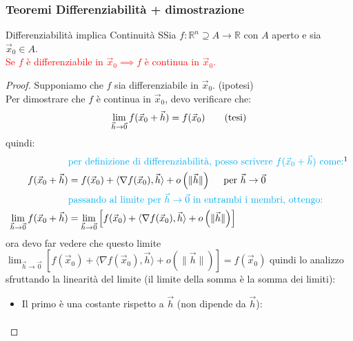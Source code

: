 \documentclass{article}  %
\begin{document}
\subsubsection{Teoremi Differenziabilità + dimostrazione}
\begin{theorem}{Differenziabilità implica Continuità}
	SSia $f: \mathbb{R}^n \supseteq A \to \mathbb{R}$ con $A$ aperto e sia $\vec{x}_0 \in A$. \\
	\textcolor{red}{Se $f$ è differenziabile in $\vec{x}_0 \implies f$ è continua in $\vec{x}_0$.}
	\begin{proof}
		Supponiamo che $f$ sia differenziabile in $\vec{x}_0$. \hfill(ipotesi) \\
		Per dimostrare che $f$ è continua in $\vec{x}_0$, devo verificare che:
		\begin{align*}
			\lim_{\vec{h} \to \vec{0}} f(\vec{x}_0 + \vec{h}) = f(\vec{x}_0) \tag*{(\text{tesi})}
		\end{align*}
		quindi:
		\begin{align*}
			                                                  & \textcolor{cyan}{\text{per definizione di differenziabilità, posso scrivere } f(\vec{x}_0 + \vec{h}) \text{ come:}} \footnotemark     \\
			f(\vec{x}_0 + \vec{h})                            & = f(\vec{x}_0)+ \langle \nabla f(\vec{x}_0), \vec{h} \rangle + o \left( \| \vec{h} \|\right) \quad \text{ per } \vec{h} \to \vec{0}   \\
			                                                  & \textcolor{cyan}{\text{passando al limite per } \vec{h} \to \vec{0} \text{ in entrambi i membri, ottengo:}}                           \\
			\lim_{\vec{h} \to \vec{0}} f(\vec{x}_0 + \vec{h}) & = \lim_{\vec{h} \to \vec{0}} \left[f(\vec{x}_0)+ \langle \nabla f(\vec{x}_0), \vec{h} \rangle + o \left( \| \vec{h} \|\right) \right]
		\end{align*}
		ora devo far vedere che questo limite $\lim_{\vec{h} \to \vec{0}} \left[f(\vec{x}_0)+ \langle \nabla f(\vec{x}_0), \vec{h} \rangle + o \left( \| \vec{h} \|\right) \right] = f(\vec{x}_0)$ quindi lo analizzo
		sfruttando la linearità del limite (il limite della somma è la somma dei limiti):
		\begin{itemize}
			\item Il primo è una costante rispetto a $\vec{h}$ (non dipende da $\vec{h}$):
			      \begin{align*}

\end{align*}
\end{itemize}
\end{proof}
\end{theorem}
\end{document}
